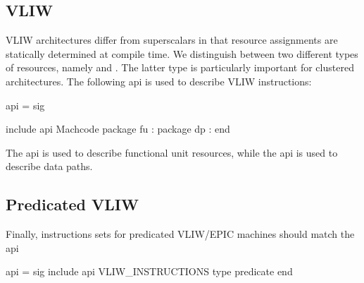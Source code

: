 \subsection{VLIW}
   VLIW architectures differ from superscalars in that
resource assignments are statically determined at compile time.
We distinguish between two different types of resources, namely
 and .  
The latter type is particularly
important for clustered architectures.
The following api
is used to describe VLIW instructions:
\begin{SML}
api  =
sig

   include api Machcode
   package fu : 
   package dp : 
end
\end{SML}
The api  is used to describe functional unit
resources, while the api  is used to describe
data paths.

\subsection{Predicated VLIW}

Finally, instructions sets for predicated VLIW/EPIC machines should match
the api 
\begin{SML}
api  =
sig
   include api VLIW_INSTRUCTIONS
   type predicate
end
\end{SML}
